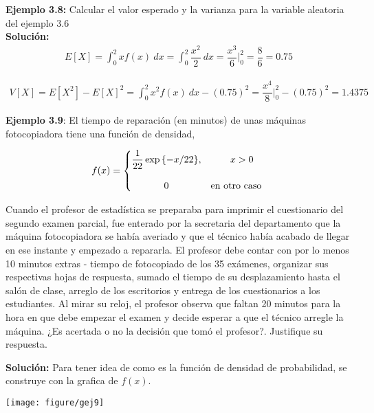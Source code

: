 \documentclass[base=hide,12pt]{elegantbook}
\begin{document}
\vspace{1cm} 
\textcolor{col3}{\bf Ejemplo 3.8:} Calcular el valor esperado y la varianza para la variable aleatoria del ejemplo 3.6 \\

\textcolor{col3}{\bf Solución:}\\

\begin{eqnarray*}
	E[X] = \int_{0}^{2} x f(x) \:dx = \int_{0}^{2} \dfrac{x^{2}}{2} \:dx = \dfrac{x^{3}}{6}\Bigg|^{2}_{0} = \dfrac{8}{6} = 0.75
\end{eqnarray*}

\begin{eqnarray*}
	V[X] = E[X^{2}] - E[X]^{2} = \int_{0}^{2} x^{2} f(x) \:dx - (0.75)^{2}  = \dfrac{x^{4}}{8}\Bigg|_{0}^{2} - (0.75)^{2} = 1.4375
\end{eqnarray*}


\vspace{1cm} 
\textcolor{col3}{\bf Ejemplo 3.9}:  El tiempo de reparación (en minutos) de unas máquinas fotocopiadora tiene una función de densidad,


$$
f(x) = \left \{ 
\begin{matrix} 
	\dfrac{1}{22}\exp{\{-x/22}\},   & \hspace{.3cm} x>0	 \\ 
	&\\
	0  & \mbox{en otro caso }
\end{matrix}\right.  
$$

Cuando el profesor de estadística se preparaba para imprimir el cuestionario del segundo examen parcial, fue enterado por la secretaria del departamento que la máquina fotocopiadora se había averiado y que el técnico había acabado de llegar en ese instante y empezado a repararla. El profesor debe contar con por lo menos 10 minutos extras - tiempo de fotocopiado de los 35 exámenes, organizar sus respectivas hojas de respuesta, sumado el tiempo de su desplazamiento hasta el salón de clase, arreglo de los escritorios y entrega de los cuestionarios a los estudiantes. Al mirar su reloj, el profesor observa que faltan 20 minutos para la hora en que debe empezar el examen  y decide esperar a que el técnico arregle la máquina. ¿Es acertada  o no la decisión que tomó el profesor?. Justifique su respuesta.	

\textcolor{col3}{\bf Solución: }
Para tener idea de como es la función de densidad de probabilidad, se construye con la grafica de $f(x)$. \\
\begin{center}
	\texttt{[image: figure/gej9]}
\end{center} 
\end{document}
